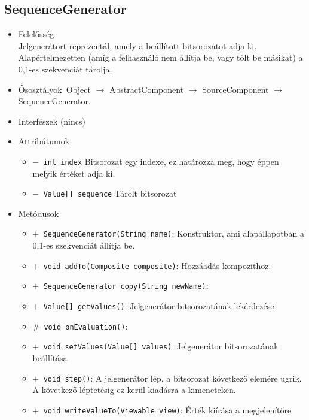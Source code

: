 \subsection{SequenceGenerator}
\begin{itemize}
\item Felelősség\\
Jelgenerátort reprezentál, amely a beállított bitsorozatot adja ki.  Alapértelmezetten (amíg a felhasználó nem állítja be, vagy tölt be másikat) a 0,1-es  szekvenciát tárolja.
\item Ősosztályok\ Object $\rightarrow{}$ AbstractComponent $\rightarrow{}$ SourceComponent $\rightarrow{}$ SequenceGenerator.
\item Interfészek (nincs)
\item Attribútumok $\ $
\begin{itemize}
	\item[] \texttt{$-$ int index} Bitsorozat egy indexe, ez határozza meg, hogy éppen melyik értéket adja ki.
	\item[] \texttt{$-$ Value[] sequence} Tárolt bitsorozat
\end{itemize}
\item Metódusok$\ $
\begin{itemize}
	\item[] \texttt{$+$ SequenceGenerator(String name)}: Konstruktor, ami alapállapotban a 0,1-es szekvenciát állítja be.
	\item[] \texttt{$+$ void addTo(Composite composite)}: Hozzáadás kompozithoz.
	\item[] \texttt{$+$ SequenceGenerator copy(String newName)}: 
	\item[] \texttt{$+$ Value[] getValues()}: Jelgenerátor bitsorozatának lekérdezése
	\item[] \texttt{$\#$ void onEvaluation()}: 
	\item[] \texttt{$+$ void setValues(Value[] values)}: Jelgenerátor bitsorozatának beállítása
	\item[] \texttt{$+$ void step()}: A jelgenerátor lép, a bitsorozat következő elemére ugrik. A következő léptetésig  ez kerül kiadásra a kimeneteken.
	\item[] \texttt{$+$ void writeValueTo(Viewable view)}: Érték kiírása a megjelenítőre
\end{itemize}
\end{itemize}

